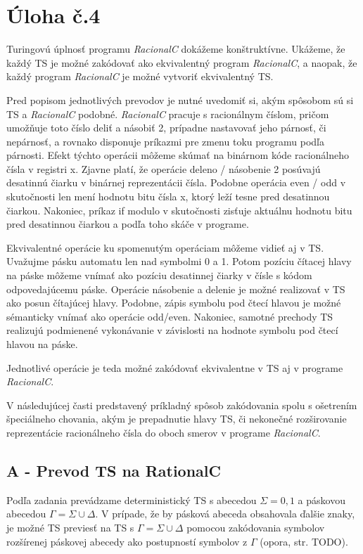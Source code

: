 \documentclass[10pt]{article}
\begin{document}
\section*{Úloha č.4}
Turingovú úplnosť programu \textit{RacionalC} dokážeme konštruktívne. Ukážeme, že každý TS je možné
zakódovať ako ekvivalentný program \textit{RacionalC}, a naopak, že každý program \textit{RacionalC}
je možné vytvoriť ekvivalentný TS.

Pred popisom jednotlivých prevodov je nutné uvedomiť si, akým spôsobom sú si TS a
\textit{RacionalC} podobné. \textit{RacionalC} pracuje s racionálnym číslom, pričom umožňuje toto číslo deliť a násobiť 2,
prípadne nastavovať jeho párnosť, či nepárnosť, a rovnako disponuje príkazmi pre zmenu toku programu
podľa párnosti. 
Efekt týchto operácii môžeme skúmať na binárnom kóde racionálneho čísla v registri x.
Zjavne platí, že operácie deleno / násobenie 2 posúvajú desatinnú čiarku v binárnej reprezentácii
čísla. Podobne operácia even / odd v skutočnosti len mení hodnotu bitu čísla x, ktorý leží tesne
pred desatinnou čiarkou. Nakoniec, príkaz if modulo v skutočnosti zisťuje aktuálnu hodnotu bitu
pred desatinnou čiarkou a podľa toho skáče v programe.

Ekvivalentné operácie ku spomenutým operáciam môžeme vidieť aj v TS. Uvažujme pásku automatu len nad
symbolmi 0 a 1. Potom pozíciu čítacej hlavy na páske
môžeme vnímať ako pozíciu desatinnej čiarky v čísle s kódom odpovedajúcemu páske.
Operácie násobenie a delenie je možné realizovať v TS ako posun čítajúcej hlavy.
Podobne, zápis symbolu pod čtecí hlavou je možné sémanticky vnímať ako operácie odd/even.
Nakoniec, samotné prechody TS realizujú podmienené vykonávanie v závislosti na hodnote symbolu pod
čtecí hlavou na páske.

Jednotlivé operácie je teda možné zakódovať ekvivalentne v TS aj v programe \textit{RacionalC}.

V následujúcej časti predstavený príkladný spôsob zakódovania spolu s ošetrením špeciálneho
chovania, akým je prepadnutie hlavy TS, či nekonečné rozširovanie reprezentácie racionálneho čísla
do oboch smerov v programe \textit{RacionalC}.

\subsection*{A - Prevod TS na RationalC}
Podľa zadania prevádzame deterministický TS s abecedou $\Sigma = {0,1}$ a páskovou abecedou 
$\Gamma = \Sigma \cup {\Delta}$. V prípade, že by pásková abeceda obsahovala ďalšie znaky, je možné 
TS previesť na TS s $\Gamma = \Sigma \cup {\Delta}$ pomocou zakódovania symbolov rozšírenej páskovej abecedy
ako postupností symbolov z $\Gamma$ (opora, str. TODO).
\end{document}
